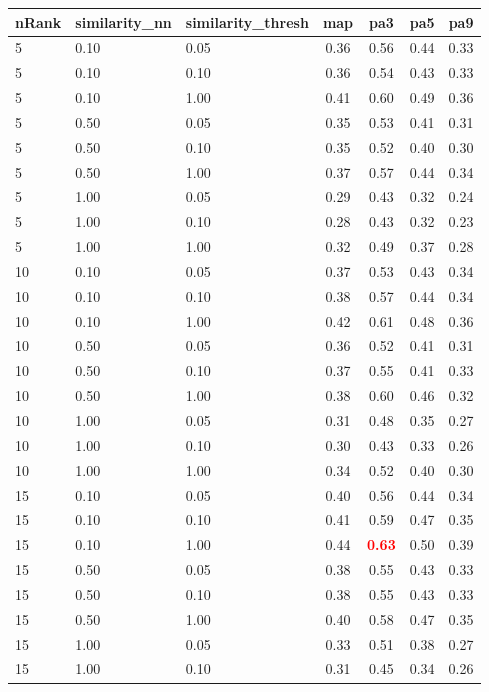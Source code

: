  
\begin{table} 
\begin{center} 
\scriptsize 
 \setlength{\tabcolsep}{.16667em} 
\begin{tabular}{lllcccc} 
nRank & similarity\_nn & similarity\_thresh & map & pa3 & pa5 & pa9 \\ 
\hline 
 5 & 0.10 & 0.05 & 0.36 & 0.56 & 0.44 & 0.33 \\ 
 5 & 0.10 & 0.10 & 0.36 & 0.54 & 0.43 & 0.33 \\ 
 5 & 0.10 & 1.00 & 0.41 & 0.60 & 0.49 & 0.36 \\ 
 5 & 0.50 & 0.05 & 0.35 & 0.53 & 0.41 & 0.31 \\ 
 5 & 0.50 & 0.10 & 0.35 & 0.52 & 0.40 & 0.30 \\ 
 5 & 0.50 & 1.00 & 0.37 & 0.57 & 0.44 & 0.34 \\ 
 5 & 1.00 & 0.05 & 0.29 & 0.43 & 0.32 & 0.24 \\ 
 5 & 1.00 & 0.10 & 0.28 & 0.43 & 0.32 & 0.23 \\ 
 5 & 1.00 & 1.00 & 0.32 & 0.49 & 0.37 & 0.28 \\ 
10 & 0.10 & 0.05 & 0.37 & 0.53 & 0.43 & 0.34 \\ 
10 & 0.10 & 0.10 & 0.38 & 0.57 & 0.44 & 0.34 \\ 
10 & 0.10 & 1.00 & 0.42 & 0.61 & 0.48 & 0.36 \\ 
10 & 0.50 & 0.05 & 0.36 & 0.52 & 0.41 & 0.31 \\ 
10 & 0.50 & 0.10 & 0.37 & 0.55 & 0.41 & 0.33 \\ 
10 & 0.50 & 1.00 & 0.38 & 0.60 & 0.46 & 0.32 \\ 
10 & 1.00 & 0.05 & 0.31 & 0.48 & 0.35 & 0.27 \\ 
10 & 1.00 & 0.10 & 0.30 & 0.43 & 0.33 & 0.26 \\ 
10 & 1.00 & 1.00 & 0.34 & 0.52 & 0.40 & 0.30 \\ 
15 & 0.10 & 0.05 & 0.40 & 0.56 & 0.44 & 0.34 \\ 
15 & 0.10 & 0.10 & 0.41 & 0.59 & 0.47 & 0.35 \\ 
15 & 0.10 & 1.00 & 0.44 & \textbf{\textcolor{red}{0.63}} & 0.50 & 0.39 \\ 
15 & 0.50 & 0.05 & 0.38 & 0.55 & 0.43 & 0.33 \\ 
15 & 0.50 & 0.10 & 0.38 & 0.55 & 0.43 & 0.33 \\ 
15 & 0.50 & 1.00 & 0.40 & 0.58 & 0.47 & 0.35 \\ 
15 & 1.00 & 0.05 & 0.33 & 0.51 & 0.38 & 0.27 \\ 
15 & 1.00 & 0.10 & 0.31 & 0.45 & 0.34 & 0.26 \\ 

\end{tabular}
\end{center}
\end{table}
